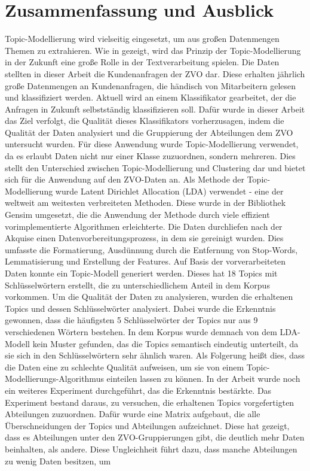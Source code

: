 \documentclass[german,version-2020-11]{uzl-thesis}
\begin{document}
\chapter{Zusammenfassung und Ausblick}%

Topic-Modellierung wird vielseitig eingesetzt, um aus großen Datenmengen Themen zu extrahieren. Wie in \cite{ptm} gezeigt, wird das Prinzip der Topic-Modellierung in der Zukunft eine große Rolle in der Textverarbeitung spielen. Die Daten stellten in dieser Arbeit die Kundenanfragen der ZVO dar. Diese erhalten jährlich große Datenmengen an Kundenanfragen, die händisch von Mitarbeitern gelesen und klassifiziert werden. Aktuell wird an einem Klassifikator gearbeitet, der die Anfragen in Zukunft selbstständig klassifizieren soll. Dafür wurde in dieser Arbeit das Ziel verfolgt, die Qualität dieses Klassifikators vorherzusagen, indem die Qualität der Daten analysiert und die Gruppierung der Abteilungen dem ZVO untersucht wurden. Für diese Anwendung wurde Topic-Modellierung verwendet, da es erlaubt Daten nicht nur einer Klasse zuzuordnen, sondern mehreren. Dies stellt den Unterschied zwischen Topic-Modellierung und Clustering dar und bietet sich für die Anwendung auf den ZVO-Daten an. Als Methode der Topic-Modellierung wurde Latent Dirichlet Allocation (LDA) verwendet - eine der weltweit am weitesten verbreiteten Methoden. Diese wurde in der Bibliothek Gensim umgesetzt, die die Anwendung der Methode durch viele effizient vorimplementierte Algorithmen erleichterte. Die Daten durchliefen nach der Akquise einen Datenvorbereitungsprozess, in dem sie gereinigt wurden. Dies umfasste die Formatierung, Ausdünnung durch die Entfernung von Stop-Words, Lemmatisierung und Erstellung der Features. Auf Basis der vorverarbeiteten Daten konnte ein Topic-Modell generiert werden. Dieses hat 18 Topics mit Schlüsselwörtern erstellt, die zu unterschiedlichem Anteil in dem Korpus vorkommen. Um die Qualität der Daten zu analysieren, wurden die erhaltenen Topics und dessen Schlüsselwörter analysiert. Dabei wurde die Erkenntnis gewonnen, dass die häufigsten 5 Schlüsselwörter der Topics nur aus 9 verschiedenen Wörtern bestehen. In dem Korpus wurde demnach von dem LDA-Modell kein Muster gefunden, das die Topics semantisch eindeutig unterteilt, da sie sich in den Schlüsselwörtern sehr ähnlich waren. Als Folgerung heißt dies, dass die Daten eine zu schlechte Qualität aufweisen, um sie von einem Topic-Modellierungs-Algorithmus einteilen lassen zu können. In der Arbeit wurde noch ein weiteres Experiment durchgeführt, das die Erkenntnis bestärkte. Das Experiment bestand daraus, zu versuchen, die erhaltenen Topics vorgefertigten Abteilungen zuzuordnen. Dafür wurde eine Matrix aufgebaut, die alle Überschneidungen der Topics und Abteilungen aufzeichnet. Diese hat gezeigt, dass es Abteilungen unter den ZVO-Gruppierungen gibt, die deutlich mehr Daten beinhalten, als  andere. Diese Ungleichheit führt dazu, dass manche Abteilungen zu wenig Daten besitzen, um 
\end{document}
